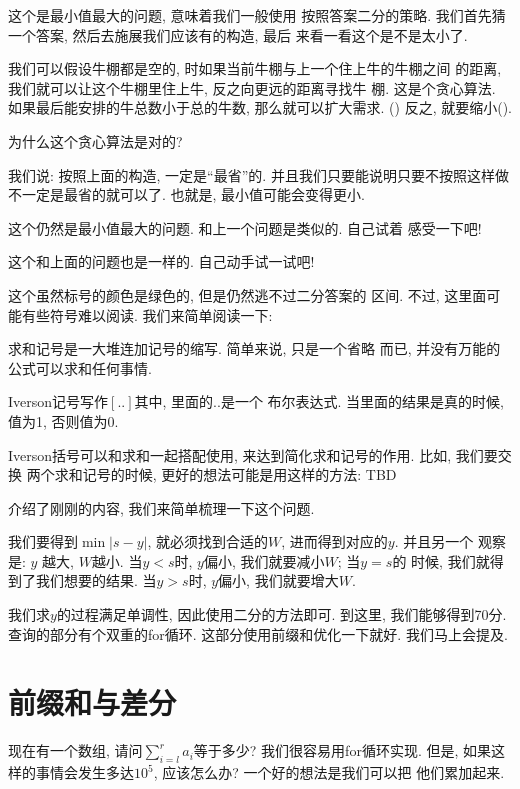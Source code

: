  这个是最小值最大的问题, 意味着我们一般使用
按照答案二分的策略. 我们首先猜一个答案, 然后去施展我们应该有的构造, 最后
来看一看这个是不是太小了. 

我们可以假设牛棚都是空的, 时如果当前牛棚与上一个住上牛的牛棚之间
的距离, 我们就可以让这个牛棚里住上牛, 反之向更远的距离寻找牛
棚. 这是个贪心算法. 如果最后能安排的牛总数小于总的牛数, 那么就可以扩大需求. 
() 
反之, 就要缩小(). 

\begin{ques}
    为什么这个贪心算法是对的? 
\end{ques}

我们说: 按照上面的构造, 一定是``最省''的. 并且我们只要能说明只要不按照这样做
不一定是最省的就可以了. 也就是, 最小值可能会变得更小. 

  这个仍然是最小值最大的问题. 和上一个问题是类似的. 自己试着
感受一下吧!

 这个和上面的问题也是一样的. 自己动手试一试吧! 

 这个虽然标号的颜色是绿色的, 但是仍然逃不过二分答案的
区间. 不过, 这里面可能有些符号难以阅读. 我们来简单阅读一下: 

 求和记号是一大堆连加记号的缩写. 简单来说, 只是一个省略
而已, 并没有万能的公式可以求和任何事情. 

 Iverson记号写作$[..]$其中, 里面的$..$是一个
布尔表达式. 当里面的结果是真的时候, 值为1, 否则值为0. 

Iverson括号可以和求和一起搭配使用, 来达到简化求和记号的作用. 比如, 我们要交换
两个求和记号的时候, 更好的想法可能是用这样的方法: TBD 

介绍了刚刚的内容, 我们来简单梳理一下这个问题. 

我们要得到$\min |s-y|$, 就必须找到合适的$W$, 进而得到对应的$y$. 并且另一个
观察是: $y$ 越大, $W$越小. 当$y<s$时, $y$偏小, 我们就要减小$W$; 当$y=s$的
时候, 我们就得到了我们想要的结果. 当$y>s$时, $y$偏小, 我们就要增大$W$. 

我们求$y$的过程满足单调性, 因此使用二分的方法即可. 到这里, 我们能够得到70分. 
查询的部分有个双重的for循环. 这部分使用前缀和优化一下就好. 我们马上会提及. 

\section{前缀和与差分}

现在有一个数组, 请问$\sum_{i=l}^r a_i$等于多少? 我们很容易用for循环实现. 
但是, 如果这样的事情会发生多达$10^5$, 应该怎么办? 一个好的想法是我们可以把
他们累加起来. 

